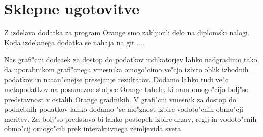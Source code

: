 \chapter{Sklepne ugotovitve}



Z izdelavo dodatka za program Orange smo zakljucili delo na diplomski nalogi.
Koda izdelanega dodatka se nahaja na git ....


% 
%
%
%
%


Nas grafi"cni dodatek za dostop do podatkov indikatorjev lahko nadgradimo tako,
da uporabnikom grafi"cnega vmesnika omogo"cimo ve"cjo izbiro oblik izhodnih
podatkov in natan"cnejse presejanje rezultatov. Dodamo lahko tudi ve"c
metapodatkov na posamezne stolpce Orange tabele, ki nam omogo"cijo bolj"so
predstavnost v ostalih Orange gradnikih. V grafi"cni vmesnik za dostop do
podnebnih podatkov lahko dodamo "se mo"znost izbire vodoto"cnih obmo"cji meritev.
Za bolj"so predstavo bi lahko postopek izbire drzav, regij in vodoto"cnih
obmo"cij omogo"cili prek interaktivnega zemljevida sveta.
